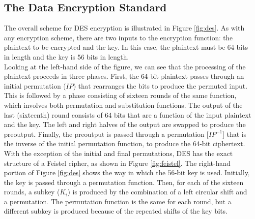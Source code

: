 \documentclass{article}
\begin{document}
\subsection{The Data Encryption Standard}
The overall scheme for DES encryption is illustrated in Figure \ref{fig:des}. As with any
encryption scheme, there are two inputs to the encryption function: the plaintext to
be encrypted and the key. In this case, the plaintext must be 64 bits in length and the
key is 56 bits in length.\\
Looking at the left-hand side of the figure, we can see that the processing
of the plaintext proceeds in three phases. First, the 64-bit plaintext passes through
an initial permutation ($IP$) that rearranges the bits to produce the permuted input.
This is followed by a phase consisting of sixteen rounds of the same function, which
involves both permutation and substitution functions. The output of the last (sixteenth)
round consists of 64 bits that are a function of the input plaintext and the
key. The left and right halves of the output are swapped to produce the preoutput.
Finally, the preoutput is passed through a permutation [$IP^{-1}$] that is the inverse of
the initial permutation function, to produce the 64-bit ciphertext. \\
With the exception of the initial and final permutations, DES has the exact structure of a Feistel
cipher, as shown in Figure \ref{fig:feistel}.
The right-hand portion of Figure \ref{fig:des} shows the way in which the 56-bit key is
used. Initially, the key is passed through a permutation function. Then, for each of
the sixteen rounds, a subkey ($K_i$) is produced by the combination of a left circular
shift and a permutation. The permutation function is the same for each round, but a
different subkey is produced because of the repeated shifts of the key bits.\\\\
\end{document}
